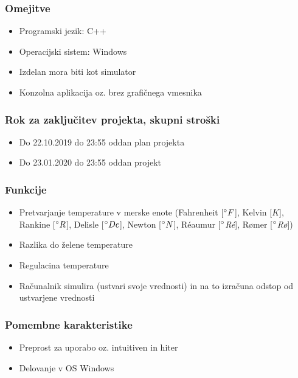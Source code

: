 \documentclass[a4paper,12pt]{article}
\begin{document}
		\subsubsection{Omejitve}

				\begin{itemize}
					\item Programski jezik: C++
					\item Operacijski sistem: Windows
					\item Izdelan mora biti kot simulator
					\item Konzolna aplikacija oz. brez grafičnega vmesnika
				\end{itemize}

		\subsubsection{Rok za zaključitev projekta, skupni stroški}

				\begin{itemize}
					\item Do 22.10.2019 do 23:55 oddan plan projekta 
					\item Do 23.01.2020 do 23:55 oddan projekt
				\end{itemize}

		\subsubsection{Funkcije}

				\begin{itemize}
						\item Pretvarjanje temperature v merske enote (Fahrenheit [$\degree F$], Kelvin [$K$], Rankine [$\degree R$], Delisle [$\degree De$], Newton [$\degree N$], Réaumur [$\degree $\textit{Ré}], Rømer [$\degree$\textit{Rø}])
					\item Razlika do želene temperature
					\item Regulacina temperature
					\item Računalnik simulira (ustvari svoje vrednosti) in na to	izračuna odstop od ustvarjene vrednosti
				\end{itemize}

		\subsubsection{Pomembne karakteristike}

				\begin{itemize}
					\item Preprost za uporabo oz. intuitiven in hiter
					\item Delovanje v OS Windows
				\end{itemize}
\end{document}
